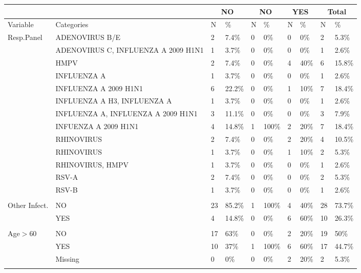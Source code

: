 \documentclass{article}\usepackage[]{graphicx}\usepackage[]{color}
\begin{document}
\begin{table}[ht]
\centering
\begin{tabular}{llllllllll}
& & \multicolumn{2}{c}{NO}& \multicolumn{2}{c}{NO }& \multicolumn{2}{c}{YES}& \multicolumn{2}{c}{Total}\\
  \hline
Variable & Categories & N & \% & N & \% & N & \% & N & \% \\ 
   \hline
Resp.Panel & ADENOVIRUS B/E & 2 & 7.4\% & 0 & 0\% & 0 & 0\% & 2 & 5.3\% \\ 
   & ADENOVIRUS C, INFLUENZA A 2009 H1N1 & 1 & 3.7\% & 0 & 0\% & 0 & 0\% & 1 & 2.6\% \\ 
   & HMPV & 2 & 7.4\% & 0 & 0\% & 4 & 40\% & 6 & 15.8\% \\ 
   & INFLUENZA A  & 1 & 3.7\% & 0 & 0\% & 0 & 0\% & 1 & 2.6\% \\ 
   & INFLUENZA A 2009 H1N1 & 6 & 22.2\% & 0 & 0\% & 1 & 10\% & 7 & 18.4\% \\ 
   & INFLUENZA A H3, INFLUENZA A & 1 & 3.7\% & 0 & 0\% & 0 & 0\% & 1 & 2.6\% \\ 
   & INFLUENZA A, INFLUENZA A 2009 H1N1 & 3 & 11.1\% & 0 & 0\% & 0 & 0\% & 3 & 7.9\% \\ 
   & INFUENZA A 2009 H1N1 & 4 & 14.8\% & 1 & 100\% & 2 & 20\% & 7 & 18.4\% \\ 
   & RHINOVIRUS & 2 & 7.4\% & 0 & 0\% & 2 & 20\% & 4 & 10.5\% \\ 
   & RHINOVIRUS  & 1 & 3.7\% & 0 & 0\% & 1 & 10\% & 2 & 5.3\% \\ 
   & RHINOVIRUS, HMPV & 1 & 3.7\% & 0 & 0\% & 0 & 0\% & 1 & 2.6\% \\ 
   & RSV-A & 2 & 7.4\% & 0 & 0\% & 0 & 0\% & 2 & 5.3\% \\ 
   & RSV-B  & 1 & 3.7\% & 0 & 0\% & 0 & 0\% & 1 & 2.6\% \\ 
   &  &  &  &  &  &  &  &  &  \\ 
  Other Infect. & NO & 23 & 85.2\% & 1 & 100\% & 4 & 40\% & 28 & 73.7\% \\ 
   & YES & 4 & 14.8\% & 0 & 0\% & 6 & 60\% & 10 & 26.3\% \\ 
   &  &  &  &  &  &  &  &  &  \\ 
  Age$>$60 & NO & 17 & 63\% & 0 & 0\% & 2 & 20\% & 19 & 50\% \\ 
   & YES & 10 & 37\% & 1 & 100\% & 6 & 60\% & 17 & 44.7\% \\ 
   & Missing & 0 & 0\% & 0 & 0\% & 2 & 20\% & 2 & 5.3\% \\ 
   &  &  &  &  &  &  &  &  &  \\ 

\end{tabular}
\end{table}
\end{document}
